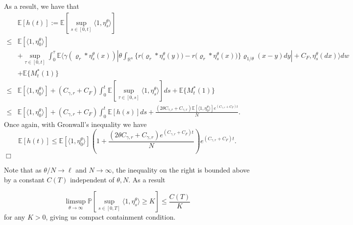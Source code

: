 \documentclass[12pt]{article}
\newenvironment {proof}{{\noindent\bf Proof }}{\hfill $\Box$ \medskip}
\begin{document}
\begin{proof}
As a result, we have that 
\begin{equation}\label{eq: Total mass control supremum control}
\begin{aligned}
&\mathbb{E}[h(t)]:=\mathbb{E}\left[\sup_{s \in [0,t]}\langle 1 ,\eta^{\theta}_{s}\rangle\right] \\
\leq &  \mathbb{E}[\langle 1 ,\eta^{\theta}_{0}\rangle] \\
&+ \sup_{\tau \in [0,t]} \int_{0}^{\tau}\mathbb{E} \bigg\langle \gamma(\varrho_{r}*\eta^{\theta}_{s}(x)) \left| \theta \int_{\mathbb{R}^n} \big\{r\big(\varrho_{r}*\eta^{\theta}_{s}(y)\big)-r\big(\varrho_{r}*\eta^{\theta}_{s}(x)\big)\big\}\varrho_{1/\theta}(x-y)dy\right| + C_F ,\eta^{\theta}_{s}(dx)  \bigg\rangle dw\\
&+ \mathbb{E}\{M^{*}_t(1)\}\\
\leq &  \mathbb{E}[\langle 1 ,\eta^{\theta}_{0}\rangle] + (C_{\gamma,r} + C_F)\int_{0}^{t}\mathbb{E} \left[ \sup_{\tau \in [0,s]} \langle 1  ,\eta^{\theta}_{s} \rangle \right]ds+\mathbb{E}\{M^{*}_t(1)\}\\
\leq &  \mathbb{E}[\langle 1 ,\eta^{\theta}_{0}\rangle] + (C_{\gamma,r} + C_F)\int_{0}^{t}\mathbb{E} \left[ h(s) \right]ds+\frac{(2 \theta C_{\gamma,r}+C_{\gamma,r})\mathbb{E}[\langle 1 ,\eta^{\theta}_{0}\rangle]e^{(C_{\gamma,r}+C_F)t}}{N}.
\end{aligned}
\end{equation}
Once again, with Gronwall's inequality we have 
\begin{equation}
\mathbb{E}[h(t)] 
\leq   \mathbb{E}[\langle 1 ,\eta^{\theta}_{0}\rangle]
            \left(1+\frac{(2 \theta C_{\gamma,r}+C_{\gamma,r})e^{(C_{\gamma,r}+C_F)t}}{N}\right)e^{(C_{\gamma,r}+C_F)t}.  
\end{equation}
\end{proof}

Note that as $\theta/N \to \ell$ and $N \to \infty$,
the inequality on the right is bounded above by a constant $C(T)$
independent of $\theta, N$.
As a result 

\begin{equation}
\limsup_{\theta \to \infty}\mathbb{P}\left[\sup_{s \in [0,T]}\langle 1 ,\eta^{\theta}_{s}\rangle \geq K\right] \leq \frac{C(T)}{K}    
\end{equation}
for any $K > 0$, giving us compact containment condition.    
\end{document}
